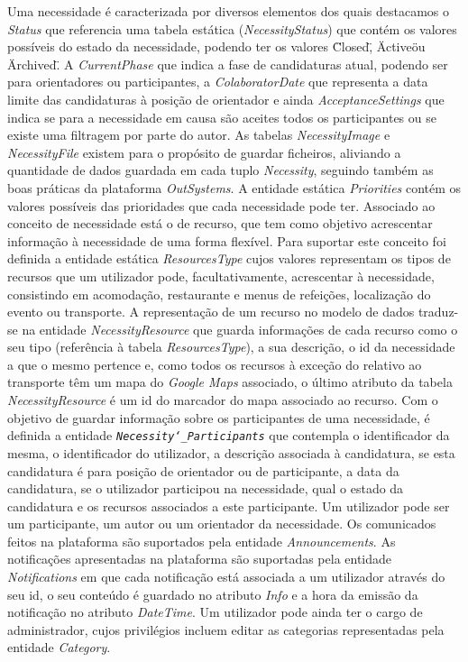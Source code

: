 
Uma necessidade é caracterizada por diversos elementos dos quais destacamos o \textit{Status} que referencia uma tabela estática (\textit{NecessityStatus}) que contém os valores possíveis do estado da necessidade, 
podendo ter os valores \"Closed\", \"Active\" ou \"Archived\". A \textit{CurrentPhase} que indica a fase de candidaturas atual, 
podendo ser para orientadores ou participantes, a \textit{ColaboratorDate} que representa a data limite das candidaturas 
à posição de orientador e ainda \textit{AcceptanceSettings} que indica se para a necessidade em causa são aceites todos os participantes ou se existe uma filtragem por parte do autor. 
As tabelas \textit{NecessityImage} e \textit{NecessityFile} existem para o propósito de guardar ficheiros, 
aliviando a quantidade de dados guardada em cada tuplo \textit{Necessity}, 
seguindo também as boas práticas da plataforma \textit{OutSystems}. 
A entidade estática \textit{Priorities} contém os valores possíveis das prioridades que cada necessidade pode ter.
Associado ao conceito de necessidade está o de recurso, que tem como objetivo acrescentar informação à necessidade de uma forma flexível. Para suportar este conceito foi definida a entidade estática \textit{ResourcesType} cujos valores representam os tipos de recursos que um utilizador pode, facultativamente, acrescentar à necessidade, consistindo em acomodação, restaurante e menus de refeições, localização do evento ou transporte. A representação de um recurso no modelo de dados traduz-se na entidade \textit{NecessityResource} que guarda informações de cada recurso como o seu tipo (referência à tabela  \textit{ResourcesType}), a sua descrição, o id da necessidade a que o mesmo pertence e, como todos os recursos à exceção do relativo ao transporte têm um mapa do \textit{Google Maps} associado, o último atributo da tabela \textit{NecessityResource} é um id do marcador do mapa associado ao recurso.
Com o objetivo de guardar informação sobre os participantes de uma necessidade, é definida a entidade \texttt{\textit{Necessity\char`_Participants}} que 
contempla o identificador da mesma, o identificador do utilizador, a descrição associada à candidatura, 
se esta candidatura é para posição de orientador ou de participante, a data da candidatura, se o utilizador participou na necessidade, qual o estado da candidatura e os recursos associados a este participante. 
Um utilizador pode ser um participante, um autor ou um orientador da necessidade. 
Os comunicados feitos na plataforma são suportados pela entidade \textit{Announcements}. As notificações apresentadas na plataforma são suportadas pela entidade \textit{Notifications} em que cada notificação está associada a um utilizador através do seu id, o seu conteúdo é guardado no atributo \textit{Info} e a hora da emissão da notificação no atributo \textit{DateTime}. 
Um utilizador pode ainda ter o cargo de administrador, cujos privilégios incluem editar as categorias representadas pela entidade \textit{Category}.

